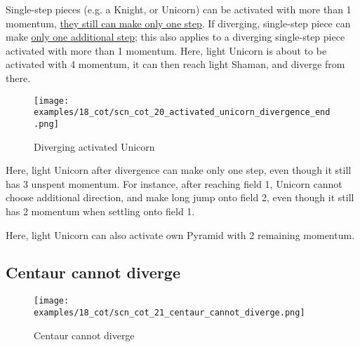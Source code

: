 \vspace*{-0.5\baselineskip}
Single-step pieces (e.g. a Knight, or Unicorn) can be activated with more than 1 momentum,
\hyperref[fig:scn_mv_32_single_step_piece_momentum]{they still can make only one step}.
If diverging, single-step piece can make
\hyperref[fig:scn_cot_16_diverging_unicorn_init]{only one additional step}; this also
applies to a diverging single-step piece activated with more than 1 momentum. \newline
\indent
Here, light Unicorn is about to be activated with 4 momentum, it can then reach light
Shaman, and diverge from there.

\clearpage %

\vspace*{-2.1\baselineskip}
\noindent
\begin{figure}[!h]
\texttt{[image: examples/18\_cot/scn\_cot\_20\_activated\_unicorn\_divergence\_end.png]}
\vspace*{-1.3\baselineskip}
\caption{Diverging activated Unicorn}
\label{fig:scn_cot_20_activated_unicorn_divergence_end}
\end{figure}

\vspace*{-0.4\baselineskip}
Here, light Unicorn after divergence can make only one step, even though it still
has 3 unspent momentum. For instance, after reaching field 1, Unicorn cannot choose
additional direction, and make long jump onto field 2, even though it still has 2
momentum when settling onto field 1.

Here, light Unicorn can also activate own Pyramid with 2 remaining momentum.

\clearpage %

\subsection*{Centaur cannot diverge}
\label{sec:Conquest of Tlalocan/Divergence/Centaur cannot diverge}

\vspace*{-1.4\baselineskip}
\noindent
\begin{figure}[!h]
\texttt{[image: examples/18\_cot/scn\_cot\_21\_centaur\_cannot\_diverge.png]}
\vspace*{-1.3\baselineskip}
\caption{Centaur cannot diverge}
\label{fig:scn_cot_21_centaur_cannot_diverge}
\end{figure}

